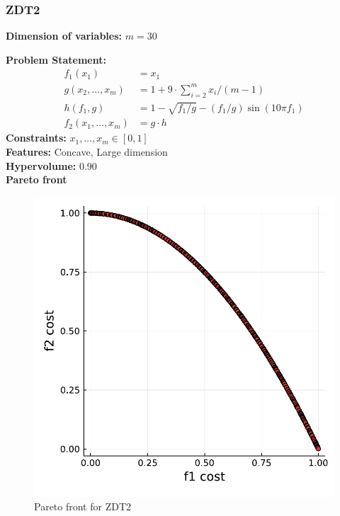 \documentclass[11pt,oneside,onecolumn,openright]{article}
\begin{document}
   \subsubsection{ZDT2~\cite{huband2006review}}
   \textbf{Dimension of variables: }$m=30$

  \noindent\textbf{Problem Statement: }
  \begin{equation}
  \begin{aligned}
  f_{1}\left(x_{1}\right) &=x_{1} \\
  g\left(x_{2}, \ldots, x_{m}\right) &=1+9 \cdot \sum_{i=2}^{m} x_{i} /(m-1) \\
  h\left(f_{1}, g\right) &=1-\sqrt{f_{1} / g}-\left(f_{1} / g\right) \sin \left(10 \pi f_{1}\right)\\
  f_2(x_{1}, \ldots, x_{m})&=g\cdot h
  \end{aligned}
  \end{equation}
  \noindent\textbf{Constraints: } $x_{1}, \ldots, x_{m}\in [0,1]$\\
  \noindent\textbf{Features: }Concave, Large dimension\\
  \noindent\textbf{Hypervolume: } 0.90\\
  \noindent\textbf{Pareto front}
      \begin{figure}[H]
      \centering
      \includegraphics[width=12cm]{fig/ncvx1.pdf}
      \cprotect\caption{Pareto front for ZDT2}
      \label{fig:ZDT2}
      \end{figure}
\end{document}
